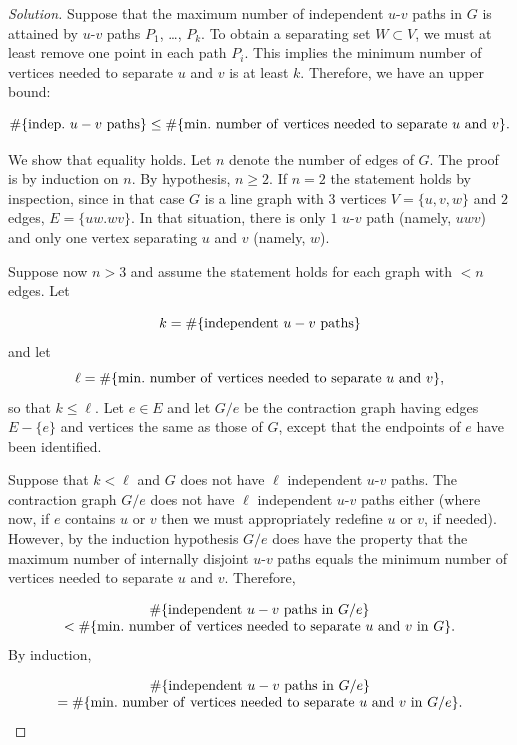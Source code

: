 \begin{proof}[Solution]
Suppose that the maximum number of independent $u$-$v$ paths in
$G$ is attained by $u$-$v$ paths $P_1$, \dots, $P_k$.
To obtain a separating set $W\subset V$, we must at least remove
one point in each path $P_i$. This implies
the minimum number of vertices needed to separate $u$ and $v$
is at least $k$. Therefore, we have an upper bound:

\[
\#\{ {\rm indep.}\ u-v\ {\rm paths}\}
\leq
\# \{{\rm min.\ number \ of\ vertices\ needed\ to\ separate}\ u\
{\rm and}\  v\}.
\]

We show that equality holds. Let $n$ denote the number
of edges of $G$. The proof is by induction on $n$. By hypothesis,
$n\geq 2$.
If $n=2$ the statement holds by inspection, since in that case
$G$ is a line graph with $3$ vertices
$V=\{u,v,w\}$ and $2$ edges, $E=\{uw.wv\}$. In that situation,
there is only $1$ $u$-$v$ path
(namely, $uwv$) and only one vertex separating $u$ and $v$
(namely, $w$).

Suppose now $n>3$ and assume the statement holds for each
graph with $<n$ edges. Let

\[
k = \#\{ {\rm independent}\ u-v\ {\rm paths}\}
\]
and let
\[
\ell =
\# \{{\rm min.\ number \ of\ vertices\ needed\ to\ separate}\
u\ {\rm and}\  v\},
\]
so that $k\leq \ell$. Let $e\in E$ and let $G/e$ be the
contraction graph having edges $E-\{e\}$ and
vertices the same as those of $G$, except that
the endpoints of $e$ have been identified.

Suppose that $k<\ell$ and $G$ does not have $\ell$
independent $u$-$v$ paths. The contraction
graph $G/e$ does not have $\ell$
independent $u$-$v$ paths either (where
now, if $e$ contains $u$ or $v$ then we must
appropriately redefine $u$ or $v$, if needed).
However, by the induction hypothesis
$G/e$ does have the property that
the maximum number of internally disjoint $u$-$v$ paths
equals the minimum number of vertices needed to separate $u$ and $v$.
Therefore,

\[
\begin{array}{c}
\#\{ {\rm independent}\ u-v\ {\rm paths\ in}\ G/e\}\\
<
\# \{{\rm min.\ number \ of\ vertices\ needed\ to\ separate}
\ u\ {\rm and}\  v\ {\rm in}\ G\}.
\end{array}
\]
By induction,

\[
\begin{array}{c}
\#\{ {\rm independent\ }u-v{\rm \ paths\ in\ }G/e\}\\
=
\# \{{\rm min.\ number \ of\ vertices\ needed\ to\ separate\
}u{\rm \ and}\  v\ {\rm in\ }G/e\}.
\end{array}
\]


\end{proof}

